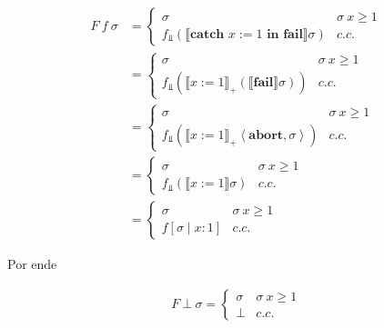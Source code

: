 \documentclass[a4paper, 12pt]{article}
\begin{document}
\begin{align*}
  F ~ f ~ \sigma 
  &= \begin{cases}
    \sigma & \sigma ~ x \geq 1 \\ 
    f_{\Bot}(\llbracket \textbf{catch } x:= 1 \textbf{ in fail}\rrbracket
    \sigma) & c.c.
  \end{cases} \\
  &=\begin{cases}
    \sigma & \sigma ~ x \geq 1 \\ 
    f_{\Bot}( \llbracket x := 1 \rrbracket_+ \left( \llbracket \textbf{fail}
  \rrbracket\sigma \right)  ) & c.c.
  \end{cases} \\ 
  &=\begin{cases}
    \sigma & \sigma ~ x \geq 1 \\ 
    f_{\Bot}( \llbracket x := 1 \rrbracket_+  \left<\textbf{abort}, \sigma \right>  ) & c.c.
  \end{cases}\\
  &=\begin{cases}
    \sigma & \sigma ~ x \geq 1 \\ 
    f_{\Bot} \left( \llbracket x:= 1 \rrbracket \sigma \right)  & c.c.
  \end{cases}\\ 
  &=\begin{cases}
    \sigma & \sigma ~ x \geq 1 \\ 
    f[\sigma \mid x : 1]  & c.c.
  \end{cases}
\end{align*}

Por ende 

\begin{align*}
  F ~ \bot ~ \sigma = \begin{cases}
    \sigma & \sigma ~ x \geq 1 \\ 
    \bot & c.c.
  \end{cases}
\end{align*}
\end{document}
